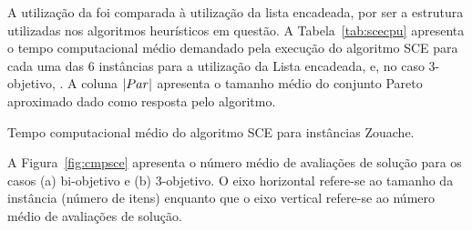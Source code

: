 A utilização da \kdtree{} foi comparada à utilização da lista encadeada,
por ser a estrutura utilizadas nos algoritmos heurísticos em questão.
A Tabela~\ref{tab:scecpu} apresenta o tempo computacional médio demandado pela execução do
algoritmo SCE para cada uma das 6 instâncias para a utilização da Lista encadeada,
 e, no caso 3-objetivo, .
A coluna $|Par|$ apresenta o tamanho médio do conjunto Pareto aproximado dado como
resposta pelo algoritmo.


\begin{table}[]
  \centering
  
  \caption{Tempo computacional médio do algoritmo SCE para instâncias Zouache.}
  \label{tab:scecpu}
\end{table}

A Figura~\ref{fig:cmpsce} apresenta o número médio de avaliações de solução
para os casos (a) bi-objetivo e (b) 3-objetivo.
O eixo horizontal refere-se ao tamanho da instância (número de itens)
enquanto que o eixo vertical refere-se ao número médio de avaliações de solução.


